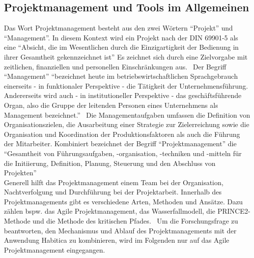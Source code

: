 \documentclass[sigconf, nonacm]{acmart}
\begin{document}
\subsection{Projektmanagement und Tools im Allgemeinen}\label{sec:pmtia}
Das Wort Projektmanagement besteht aus den zwei Wörtern \enquote{Projekt} und \enquote{Management}. 
In diesem Kontext wird ein Projekt nach der DIN 69901-5 als eine \enquote{Absicht, die im Wesentlichen durch die Einzigartigkeit der Bedienung in ihrer Gesamtheit gekennzeichnet ist} Es zeichnet sich durch eine Zielvorgabe mit zeitlichen, finanziellen und personellen Einschränkungen aus.~\cite{DIN69901-5} 
Der Begriff \enquote{Management} \enquote{bezeichnet heute im betriebswirtschaftlichen Sprachgebrauch einerseits - in funktionaler Perspektive - die Tätigkeit der Unternehmensführung. Andererseits wird auch - in institutioneller Perspektive - das geschäftsführende Organ, also die Gruppe der leitenden Personen eines Unternehmens als Management bezeichnet.}~\cite{haric_definition_nodate} 
Die Managementaufgaben umfassen die Definition von Organisationszielen, die Ausarbeitung einer Strategie zur Zielerreichung sowie die Organisation und Koordination der Produktionsfaktoren als auch die Führung der Mitarbeiter.
Kombiniert bezeichnet der Begriff \enquote{Projektmanagement} die \enquote{Gesamtheit von Führungsaufgaben, -organisation, -techniken und -mitteln für die Initiierung, Definition, Planung, Steuerung und den Abschluss von Projekten}~\cite{DIN69901-5}
\\
Generell hilft das Projektmanagement einem Team bei der Organisation, Nachtverfolgung und Durchführung bei der Projektarbeit. Innerhalb des Projektmanagements gibt es verschiedene Arten, Methoden und Ansätze. Dazu zählen bspw. das Agile Projektmanagement, das Wasserfallmodell, die PRINCE2-Methode und die Methode des kritischen Pfades.~\cite{asana_projektmanagement_nodate} Um die Forschungsfrage zu beantworten, den Mechanismus und Ablauf des Projektmanagements mit der Anwendung Habitica zu kombinieren, wird im Folgenden nur auf das Agile Projektmanagement eingegangen.
\end{document}
